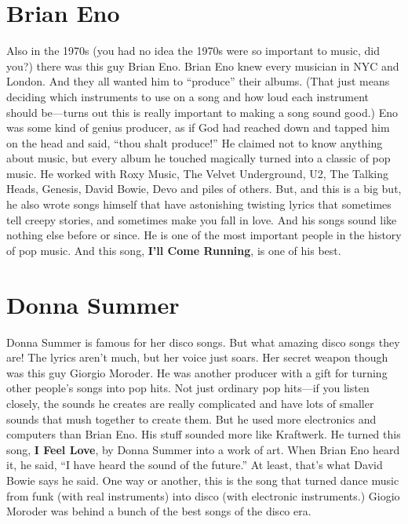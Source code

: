 \documentclass[letterpaper,single]{article}
\begin{document}
\section{Brian Eno}
Also in the 1970s (you had no idea the 1970s were so important to music, did you?) there was this guy Brian Eno. 
Brian Eno knew every musician in NYC and London. 
And they all wanted him to ``produce'' their albums. 
(That just means deciding which instruments to use on a song and how loud each instrument should be---turns out this is really important to making a song sound good.) 
Eno was some kind of genius producer, as if God had reached down and tapped him on the head and said, ``thou shalt produce!''
He claimed not to know anything about music, but every album he touched magically turned into a classic of pop music. 
He worked with Roxy Music, The Velvet Underground, U2, The Talking Heads, Genesis, David Bowie, Devo and piles of others. 
But, and this is a big but, he also wrote songs himself that have astonishing twisting lyrics that sometimes tell creepy stories, and sometimes make you fall in love. 
And his songs sound like nothing else before or since. 
He is one of the most important people in the history of pop music. 
And this song, \textbf{I'll Come Running}, is one of his best.

\section{Donna Summer}
Donna Summer is famous for her disco songs. 
But what amazing disco songs they are! 
The lyrics aren't much, but her voice just soars. 
Her secret weapon though was this guy Giorgio Moroder. 
He was another producer with a gift for turning other people's songs into pop hits. 
Not just ordinary pop hits---if you listen closely, the sounds he creates are really complicated and have lots of smaller sounds that mush together to create them.
But he used more electronics and computers than Brian Eno. 
His stuff sounded more like Kraftwerk. 
He turned this song, \textbf{I Feel Love}, by Donna Summer into a work of art. 
When Brian Eno heard it, he said, ``I have heard the sound of the future.'' 
At least, that's what David Bowie says he said. 
One way or another, this is the song that turned dance music from funk (with real instruments) into disco (with electronic instruments.)
Giogio Moroder was behind a bunch of the best songs of the disco era.
\end{document}
